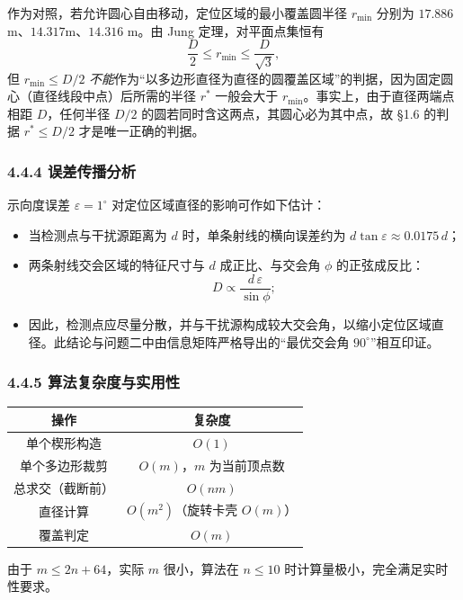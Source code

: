 \documentclass[UTF8, zihao=5,AutoFakeBold=2]{ctexart}
\begin{document}
	作为对照，若允许圆心自由移动，定位区域的最小覆盖圆半径 \(r_{\min}\) 分别为 \(17.886\)m、\(14.317\)m、\(14.316\) m。由 Jung 定理，对平面点集恒有
	\[
		\frac{D}{2}\le r_{\min}\le\frac{D}{\sqrt3},
	\]
	但 \(r_{\min}\le D/2\) \emph{不能}作为“以多边形直径为直径的圆覆盖区域”的判据，因为固定圆心（直径线段中点）后所需的半径 \(r^*\) 一般会大于 \(r_{\min}\)。事实上，由于直径两端点相距 \(D\)，任何半径 \(D/2\) 的圆若同时含这两点，其圆心必为其中点，故 \S1.6 的判据 \(r^*\le D/2\) 才是唯一正确的判据。

	\subsubsection*{4.4.4 误差传播分析}

	示向度误差 \(\varepsilon=1^\circ\) 对定位区域直径的影响可作如下估计：
	\begin{itemize}
		\item 当检测点与干扰源距离为 \(d\) 时，单条射线的横向误差约为 \(d\tan\varepsilon\approx0.0175\,d\)；
		\item 两条射线交会区域的特征尺寸与 \(d\) 成正比、与交会角 \(\phi\) 的正弦成反比：
		\[
			D\propto\frac{d\,\varepsilon}{\sin\phi};
		\]
		\item 因此，检测点应尽量分散，并与干扰源构成较大交会角，以缩小定位区域直径。此结论与问题二中由信息矩阵严格导出的“最优交会角 \(90^\circ\)”相互印证。
	\end{itemize}

	\subsubsection*{4.4.5 算法复杂度与实用性}

	\begin{table}[H]
		\centering
		\begin{tabular}{cc}
			\toprule
			操作 & 复杂度 \\
			\midrule
			单个楔形构造 & \(O(1)\) \\
			单个多边形裁剪 & \(O(m)\)，\(m\) 为当前顶点数 \\
			总求交（截断前） & \(O(nm)\) \\
			直径计算 & \(O(m^2)\)（旋转卡壳 \(O(m)\)） \\
			覆盖判定 & \(O(m)\) \\
			\bottomrule
		\end{tabular}
	\end{table}

	由于 \(m\le2n+64\)，实际 \(m\) 很小，算法在 \(n\le10\) 时计算量极小，完全满足实时性要求。
\end{document}
